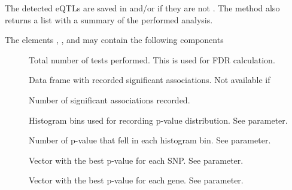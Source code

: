 \documentclass[a4paper]{book}
\begin{document}
\begin{Value}

The detected eQTLs are saved in 
and/or  if they are not .
The method also returns a list with a summary of the performed analysis.





The elements , , and 
may contain the following components
\begin{description}

\item[] 
Total number of tests performed. This is used for FDR calculation.

\item[] 
Data frame with recorded significant associations.
Not available if 

\item[] 
Number of significant associations recorded.

\item[] 
Histogram bins used for recording p-value distribution.
See  parameter.
\item[] 
Number of p-value that fell in each histogram bin.
See  parameter.

\item[] 
Vector with the best p-value for each SNP.
See  parameter.

\item[] 
Vector with the best p-value for each gene.
See  parameter.


\end{description}


\end{Value}
%
\end{document}
